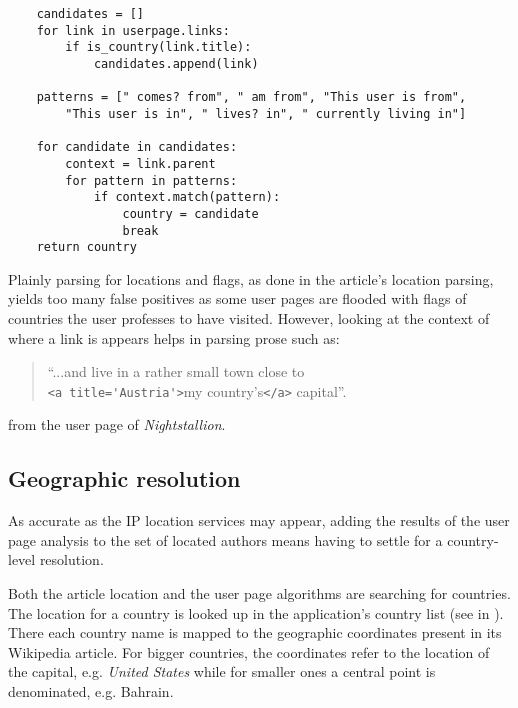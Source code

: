 \begin{lstlisting}
	candidates = []
	for link in userpage.links:
		if is_country(link.title):
			candidates.append(link)

	patterns = [" comes? from", " am from", "This user is from", 
		"This user is in", " lives? in", " currently living in"]
		
	for candidate in candidates:
		context = link.parent
		for pattern in patterns:
			if context.match(pattern):
				country = candidate
				break
	return country
\end{lstlisting}

Plainly parsing for locations and flags, as done in the article's location parsing, yields too many false positives as some user pages are flooded with flags of countries the user professes to have visited.
However, looking at the context of where a link is appears helps in parsing prose such as:
\begin{quotation}
 ``...and live in a rather small town close to \\\verb"<a title='Austria'>"my country's\verb"</a>" capital''.
\end{quotation}
from the user page of \emph{Nightstallion}.


\subsection{Geographic resolution}\label{sub:resolution}

As accurate as the \ac{IP} location services may appear, adding the results of the user page analysis to the set of located authors means having to settle for a country-level resolution.

Both the article location and the user page algorithms are searching for countries.
The location for a country is looked up in the application's country list (see  in ).
There each country name is mapped to the geographic coordinates present in its Wikipedia article.
For bigger countries, the coordinates refer to the location of the capital, e.g. \emph{United States} while for smaller ones a central point is denominated, e.g. Bahrain.

